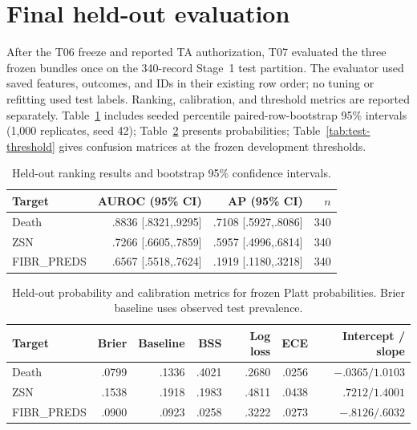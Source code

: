 \section{Final held-out evaluation}
After the T06 freeze and reported TA authorization, T07 evaluated the three frozen bundles once on the 340-record Stage~1 test partition. The evaluator used saved features, outcomes, and IDs in their existing row order; no tuning or refitting used test labels. Ranking, calibration, and threshold metrics are reported separately. Table~\ref{tab:test-rank} includes seeded percentile paired-row-bootstrap 95\% intervals (1,000 replicates, seed 42); Table~\ref{tab:test-cal} presents probabilities; Table~\ref{tab:test-threshold} gives confusion matrices at the frozen development thresholds.

\begin{table}[H]\centering\small
\caption{Held-out ranking results and bootstrap 95\% confidence intervals.}\label{tab:test-rank}
\begin{tabular}{lrrr}\toprule
Target & AUROC (95\% CI) & AP (95\% CI) & $n$\\\midrule
Death & .8836 [.8321,.9295] & .7108 [.5927,.8086] & 340\\
ZSN & .7266 [.6605,.7859] & .5957 [.4996,.6814] & 340\\
FIBR\_PREDS & .6567 [.5518,.7624] & .1919 [.1180,.3218] & 340\\\bottomrule
\end{tabular}\end{table}

\begin{table}[H]\centering\small
\caption{Held-out probability and calibration metrics for frozen Platt probabilities. Brier baseline uses observed test prevalence.}\label{tab:test-cal}
\begin{tabular}{lrrrrrr}\toprule
Target & Brier & Baseline & BSS & Log loss & ECE & Intercept / slope\\\midrule
Death & .0799 & .1336 & .4021 & .2680 & .0256 & $-.0365/1.0103$\\
ZSN & .1538 & .1918 & .1983 & .4811 & .0438 & $.7212/1.4001$\\
FIBR\_PREDS & .0900 & .0923 & .0258 & .3222 & .0273 & $-.8126/.6032$\\\bottomrule
\end{tabular}\end{table}


